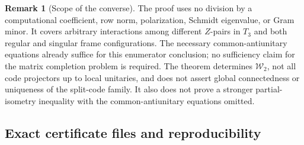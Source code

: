 \documentclass[11pt]{article}
\theoremstyle{definition}
\newtheorem{remark}[theorem]{Remark}
\begin{document}
\begin{remark}[Scope of the converse]
The proof uses no division by a computational coefficient, row norm,
polarization, Schmidt eigenvalue, or Gram minor. It covers arbitrary
interactions among different \(Z\)-pairs in \(T_3\) and both regular
and singular frame configurations. The necessary common-antiunitary
equations already suffice for this enumerator conclusion; no
sufficiency claim for the matrix completion problem is required.
The theorem determines \(\mathcal W_2\), not all code projectors up to
local unitaries, and does not assert global connectedness or uniqueness
of the split-code family. It also does not prove a stronger
partial-isometry inequality with the common-antiunitary equations
omitted.
\end{remark}

\subsection{Exact certificate files and reproducibility}
\label{o2gc:subsec-reproducibility}
\end{document}

